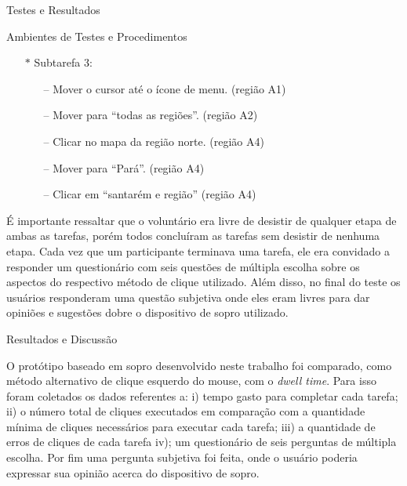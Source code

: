 \begin{chapter}{Testes e Resultados}
\begin{section}{Ambientes de Testes e Procedimentos}
\begin{itemize}
\begin{itemize}
\begin{itemize}
		\item[--] Mover para ``todas as Regiões''.                       \hfill (região A2)
		\item[--] mover para ``norte''.                                  \hfill (região A3)
		\item[--] Clicar em ``belém e região''.                          \hfill (região A4)
		\end{itemize}
	\item[$\ast$] Subtarefa 3:
		\begin{itemize}
		\item[--] Mover o cursor até o ícone de menu.                    \hfill(região A1)
		\item[--] Mover para ``todas as regiões''.                       \hfill(região A2)
		\item[--] Clicar no mapa da região norte.                        \hfill(região A4)
		\item[--] Mover para ``Pará''.                                   \hfill(região A4)
		\item[--] Clicar em ``santarém e região''                        \hfill(região A4)
		\end{itemize}
	\end{itemize}
\end{itemize}

É importante ressaltar que o voluntário era livre de desistir de qualquer etapa
de ambas as tarefas, porém todos concluíram as tarefas sem desistir de nenhuma
etapa. Cada vez que um participante terminava uma tarefa, ele era convidado a responder
um questionário com seis questões de múltipla escolha sobre os aspectos do
respectivo método de clique utilizado. Além disso, no final do teste os usuários
responderam uma questão subjetiva onde eles eram livres para dar opiniões e
sugestões dobre o dispositivo de sopro utilizado.
\end{section}

\begin{section}{Resultados e Discussão}

O protótipo baseado em sopro desenvolvido neste trabalho foi comparado, como
método alternativo de clique esquerdo do mouse, com o \textit{dwell time}. Para
isso foram coletados os dados referentes a: i) tempo gasto para completar cada
tarefa; ii) o número total de cliques executados em comparação com a quantidade
mínima de cliques necessários para executar cada tarefa; iii) a quantidade de
erros de cliques de cada tarefa iv); um questionário de seis perguntas de
múltipla escolha. Por fim uma pergunta subjetiva foi feita, onde o usuário
poderia expressar sua opinião acerca do dispositivo de sopro.


\end{section}
\end{chapter}
